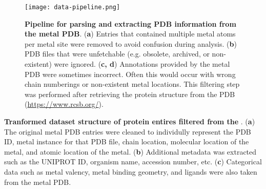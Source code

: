 \documentclass[../main/main]{subfiles}
\begin{document}
\begin{figure}[H]
  \centering
  \texttt{[image: data-pipeline.png]}
  \caption[Pipeline for parsing and extracting PDB information from the metal PDB]
  {
    \textbf{Pipeline for parsing and extracting PDB information from the metal PDB}.
    (\textbf{a}) Entries that contained multiple metal atoms per metal site were removed to avoid confusion during analysis.
    (\textbf{b}) PDB files that were unfetchable (e.g. obsolete, archived, or non-existent) were ignored.
    (\textbf{c, d}) Annotations provided by the metal PDB were sometimes incorrect. Often this would occur with wrong chain numberings or non-existent metal locations. This filtering step was performed after retrieving the protein structure from the PDB (\url{https://www.rcsb.org/}).
  }
  \label{\figname{C}{2}}
\end{figure}
\clearpage %

\begin{table}[H]
\centering
	\begin{subtable}[H]{\columnwidth}
		\caption{}
		\centering
		\footnotesize
		
	\end{subtable}
\end{table}
%
\vspace{-\baselineskip}
%
\begin{table}[H]
\ContinuedFloat
	\begin{subtable}[H]{\columnwidth}
		\caption{}
		\centering
		\footnotesize
		
	\end{subtable}
	\begin{subtable}[H]{\columnwidth}
		\caption{}
		\centering
		\footnotesize
		
	\end{subtable}
	\caption[Tranformed dataset structure of protein entires filtered from the \mPDB{}]
	{
		\textbf{Tranformed dataset structure of protein entires filtered from the \mPDB{}}.
		(\textbf{a}) The original metal PDB entries were cleaned to individully represent the PDB ID, metal instance for that PDB file, chain location, molecular location of the metal, and atomic location of the metal.
		(\textbf{b}) Additional metadata was extracted such as the UNIPROT ID, organism name, accession number, etc.
		(\textbf{c}) Categorical data such as metal valency, metal binding geometry, and ligands were also taken from the metal PDB.
	}
	\label{\inputtable{C}{2}}
\end{table}
\end{document}
